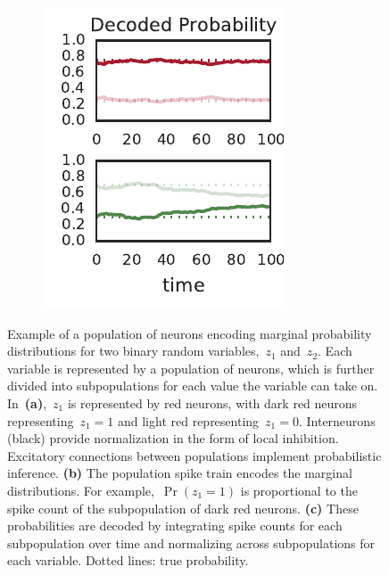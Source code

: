 \begin{figure}[t!]
\begin{subfigure}[b]{1.8in}
    \includegraphics[width=\textwidth]{figures/ch9/example_prs}
    \label{fig:representation_prs}
  \end{subfigure}
  \vspace{-.25in}
  \caption[Example of a population of neurons encoding a probability
    distribution] {Example of a population of neurons encoding marginal
    probability distributions for two binary random variables,~$z_1$
    and~$z_2$. Each variable is represented by a population of neurons,
    which is further divided into subpopulations for each value the variable
    can take on. In~\textbf{(a)},~$z_1$ is represented by red neurons, with
    dark red neurons representing~${z_1=1}$ and light red representing~${z_1=0}$.
    Interneurons (black) provide normalization in the form of local inhibition.
    Excitatory connections between populations implement probabilistic inference.
    \textbf{(b)} The population spike train encodes the marginal distributions.
    For example,~${\Pr(z_1=1)}$ is proportional to the spike count of the subpopulation
    of dark red neurons.
    \textbf{(c)} These probabilities are decoded by integrating
    spike counts for each subpopulation over time and normalizing across
    subpopulations for each variable. Dotted lines: true probability. 
  }
 \label{fig:representation}
\end{figure}



